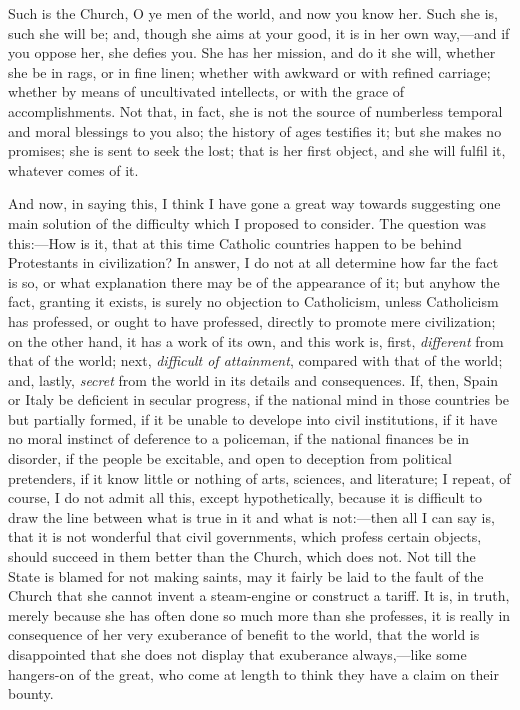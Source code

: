 Such is the Church, O ye men of the world, and now you know her.
Such she is, such she will be; and, though she aims at your good, it
is in her own way,—and if you oppose her, she defies you. She has
her mission, and do it she will, whether she be in rags, or in fine
linen; whether with awkward or with refined carriage; whether by means
of uncultivated intellects, or with the grace of accomplishments. Not
that, in fact, she is not the source of numberless temporal and moral
blessings to you also; the history of ages testifies it; but she makes
no promises; she is sent to seek the lost; that is her first object,
and she will fulfil it, whatever comes of it.

And now, in saying this, I think I have gone a great way towards
suggesting one main solution of the difficulty which I proposed to
consider. The question was this:—How is it, that at this time
Catholic countries happen to be behind Protestants in civilization? In
answer, I do not at all determine how far the fact is so, or what
explanation there may be of the appearance of it; but anyhow the fact,
granting it exists, is surely no objection to Catholicism, unless
Catholicism has professed, or ought to have professed, directly to
promote mere civilization; on the other hand, it has a work of its
own, and this work is, first, \emph{different} from that of the world;
next, \emph{difficult of attainment}, compared with that of the world;
and, lastly, \emph{secret} from the world in its details and
consequences. If, then, Spain or Italy be deficient in secular
progress, if the national mind in those countries be but partially
formed, if it be unable to develope into civil institutions, if it
have no moral instinct of deference to a policeman, if the national
finances be in disorder, if the people be excitable, and open to
deception from political pretenders, if it know little or nothing of
arts, sciences, and literature; I repeat, of course, I do not admit
all this, except hypothetically, because it is difficult to draw the
line between what is true in it and what is not:—then all I can say
is, that it is not wonderful that civil governments, which profess
certain objects, should succeed in them better than the Church, which
does not. Not till the State is blamed for not making saints, may it
fairly be laid to the fault of the Church that she cannot invent a
steam-engine or construct a tariff. It is, in truth, merely because
she has often done so much more than she professes, it is really in
consequence of her very exuberance of benefit to the world, that the
world is disappointed that she does not display that exuberance
always,—like some hangers-on of the great, who come at length to
think they have a claim on their bounty.

